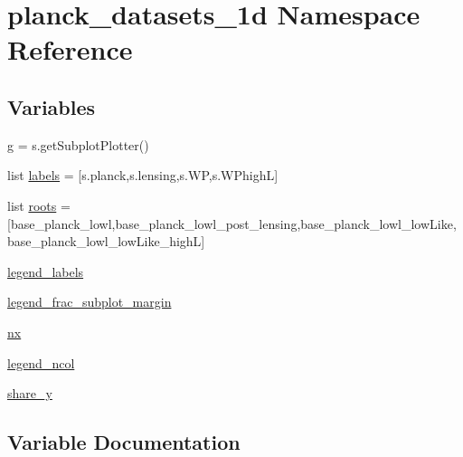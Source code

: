 \hypertarget{namespaceplanck__datasets__1d}{}\section{planck\+\_\+datasets\+\_\+1d Namespace Reference}
\label{namespaceplanck__datasets__1d}
\subsection*{Variables}
\begin{DoxyCompactItemize}
\item 
\mbox{\hyperlink{namespaceplanck__datasets__1d_a850ae2d5bf944549356711ab97206510}{g}} = s.\+get\+Subplot\+Plotter()
\item 
list \mbox{\hyperlink{namespaceplanck__datasets__1d_a7e7d380da835490dcb5f02f29e239ac4}{labels}} = \mbox{[}s.\+planck,s.\+lensing,s.\+WP,s.\+W\+PhighL\mbox{]}
\item 
list \mbox{\hyperlink{namespaceplanck__datasets__1d_aa33ba431334a12eb5d799cbc4baac87a}{roots}} = \mbox{[}\textquotesingle{}base\+\_\+planck\+\_\+lowl\textquotesingle{},\textquotesingle{}base\+\_\+planck\+\_\+lowl\+\_\+post\+\_\+lensing\textquotesingle{},\textquotesingle{}base\+\_\+planck\+\_\+lowl\+\_\+low\+Like\textquotesingle{},\textquotesingle{}base\+\_\+planck\+\_\+lowl\+\_\+low\+Like\+\_\+highL\textquotesingle{}\mbox{]}
\item 
\mbox{\hyperlink{namespaceplanck__datasets__1d_a2d676dcb8c1cd1a8502e9d2e485f83bc}{legend\+\_\+labels}}
\item 
\mbox{\hyperlink{namespaceplanck__datasets__1d_a62b205a40729e6ddec987a6f0087d947}{legend\+\_\+frac\+\_\+subplot\+\_\+margin}}
\item 
\mbox{\hyperlink{namespaceplanck__datasets__1d_a8a9d61f8cbcbc1bfbb9cb021af6f38e8}{nx}}
\item 
\mbox{\hyperlink{namespaceplanck__datasets__1d_ae44ad567ebc40b5064674fe4258672dd}{legend\+\_\+ncol}}
\item 
\mbox{\hyperlink{namespaceplanck__datasets__1d_a0b1ae04bdbf896a5637295cd876ab2fd}{share\+\_\+y}}
\end{DoxyCompactItemize}


\subsection{Variable Documentation}
\mbox{\label{namespaceplanck__datasets__1d_a850ae2d5bf944549356711ab97206510}} 
